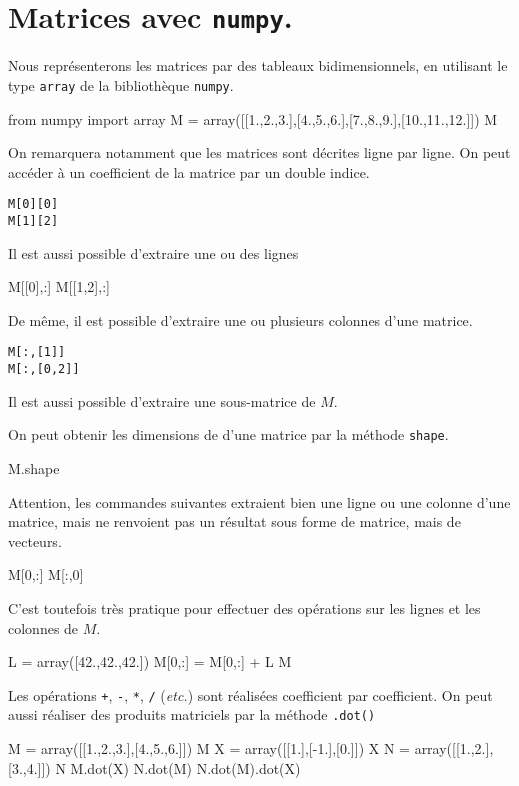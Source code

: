 \section{Matrices avec \texttt{numpy}.}

Nous représenterons les matrices par des tableaux bidimensionnels, en utilisant le type \texttt{array} de la bibliothèque \texttt{numpy}. 

\begin{xxpyconsole}

\begin{pyconsole}
from numpy import array
M = array([[1.,2.,3.],[4.,5.,6.],[7.,8.,9.],[10.,11.,12.]])
M
\end{pyconsole}

\end{xxpyconsole}

On remarquera notamment que les matrices sont décrites ligne par ligne. 
On peut accéder à un coefficient de la matrice par un double indice. 
\begin{lstlisting}
M[0][0]
M[1][2]
\end{lstlisting}

Il est aussi possible d'extraire une ou des lignes

\begin{pyconsole}
M[[0],:]
M[[1,2],:]
\end{pyconsole}

De même, il est possible d'extraire une ou plusieurs colonnes d'une matrice. 
\begin{lstlisting}
M[:,[1]]
M[:,[0,2]]
\end{lstlisting}

\begin{rem}
Il est aussi possible d'extraire une sous-matrice de $M$. 
\end{rem}
On peut obtenir les dimensions de d'une matrice par la méthode \texttt{shape}.
\begin{pyconsole}
M.shape
\end{pyconsole}
\begin{rem}
Attention, les commandes suivantes extraient bien une ligne ou une colonne d'une matrice, mais ne renvoient pas un résultat sous forme de matrice, mais de vecteurs. 
\begin{pyconsole}
M[0,:]
M[:,0]
\end{pyconsole}
C'est toutefois très pratique pour effectuer des opérations sur les lignes et les colonnes de $M$.
\begin{pyconsole}
L = array([42.,42.,42.])
M[0,:] = M[0,:] + L
M
\end{pyconsole}
\end{rem}
Les opérations \texttt{+}, \texttt{-}, \texttt{*}, \texttt{/} (\emph{etc.}) sont réalisées coefficient par coefficient. 
On peut aussi réaliser des produits matriciels par la méthode \texttt{.dot()}
\begin{pyconsole}
M = array([[1.,2.,3.],[4.,5.,6.]])
M
X = array([[1.],[-1.],[0.]])
X
N = array([[1.,2.],[3.,4.]])
N
M.dot(X)
N.dot(M)
N.dot(M).dot(X)
\end{pyconsole}



